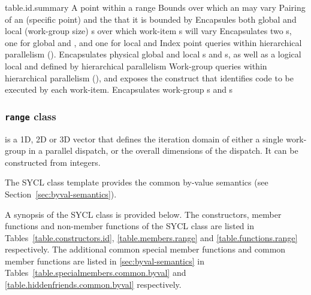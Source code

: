 {table.id.summary}
   {A point within a range}
   {Bounds over which an  may vary}
   {Pairing of an  (specific point) and the  that it is bounded by}
   {Encapsules both global and local (work-group size) \mbox{s} over which work-item \mbox{s} will vary}
   {Encapsulates two \mbox{s}, one for global  and , and one for local  and }
   {Index point queries within hierarchical parallelism ().  Encapsulates physical global and local \mbox{s} and \mbox{s}, as well as a logical local  and  defined by hierarchical parallelism}
   {Work-group queries within hierarchical parallelism (), and exposes the  construct that identifies code to be executed by each work-item.  Encapsulates work-group \mbox{s} and \mbox{s}}
\completeTable


\subsubsection{\texttt{range} class}
\label{range-class}

 is a 1D, 2D or 3D vector that defines
the iteration domain of either a single work-group in a parallel
dispatch, or the overall dimensions of the dispatch. It can be
constructed from integers.

The SYCL  class template provides the common by-value
semantics (see Section~\ref{sec:byval-semantics}).

A synopsis of the SYCL  class is provided below. The constructors, member functions and non-member functions of the SYCL  class are listed in Tables~\ref{table.constructors.id}, \ref{table.members.range} and \ref{table.functions.range} respectively. The additional common special member functions and common member functions are listed in \ref{sec:byval-semantics} in Tables~\ref{table.specialmembers.common.byval} and \ref{table.hiddenfriends.common.byval} respectively.

